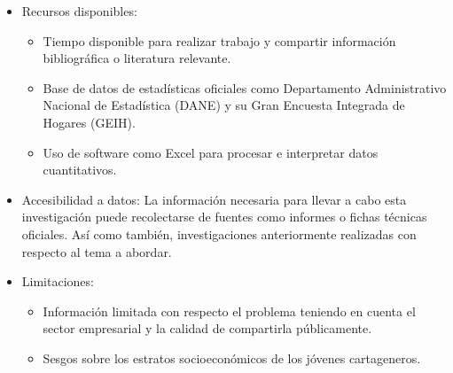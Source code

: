 \documentclass[letterpaper, 12pt]{article}
\begin{document}
\begin{itemize}
      \item Recursos disponibles:
            \begin{itemize}
                  \item Tiempo disponible para realizar trabajo y compartir 
                  información bibliográfica o literatura relevante. 

                  \item Base de datos de estadísticas oficiales como Departamento 
                  Administrativo Nacional de Estadística (DANE) y su Gran Encuesta 
                  Integrada de Hogares (GEIH). 

                  \item Uso de software como Excel para procesar e interpretar
                  datos cuantitativos. 
            \end{itemize}

      \item Accesibilidad a datos:
            La información necesaria para llevar a cabo esta investigación puede 
            recolectarse de fuentes como informes o fichas técnicas oficiales. Así 
            como también, investigaciones anteriormente realizadas con respecto 
            al tema a abordar.  
      
      \item Limitaciones:
            \begin{itemize}
                  \item Información limitada con respecto el problema teniendo en 
                  cuenta el sector empresarial y la calidad de compartirla públicamente. 

                  \item Sesgos sobre los estratos socioeconómicos de los 
                  jóvenes cartageneros. 
            \end{itemize}
\end{itemize}

\newpage
\printbibliography{}
\end{document}
